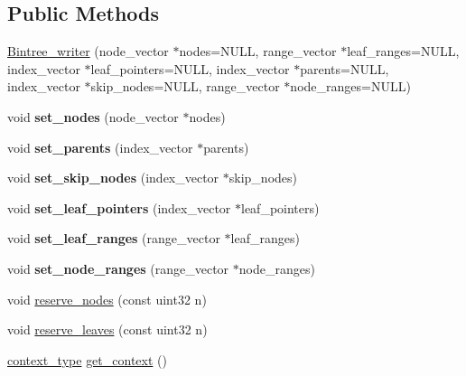 \subsection*{Public Methods}
\begin{DoxyCompactItemize}
\item 
\hyperlink{structcugar_1_1_bintree__writer_aa6285a28d4809fe64221e532ecbec891}{Bintree\+\_\+writer} (node\+\_\+vector $\ast$nodes=N\+U\+LL, range\+\_\+vector $\ast$leaf\+\_\+ranges=N\+U\+LL, index\+\_\+vector $\ast$leaf\+\_\+pointers=N\+U\+LL, index\+\_\+vector $\ast$parents=N\+U\+LL, index\+\_\+vector $\ast$skip\+\_\+nodes=N\+U\+LL, range\+\_\+vector $\ast$node\+\_\+ranges=N\+U\+LL)
\item 
\mbox{\label{structcugar_1_1_bintree__writer_afdc80c794419b3f83e3a6db5383cd63a}} 
void {\bfseries set\+\_\+nodes} (node\+\_\+vector $\ast$nodes)
\item 
\mbox{\label{structcugar_1_1_bintree__writer_a01c1fd5dc32bf390b9c7381b54e501f8}} 
void {\bfseries set\+\_\+parents} (index\+\_\+vector $\ast$parents)
\item 
\mbox{\label{structcugar_1_1_bintree__writer_ad81143b0029d8ad763a7eb78cdd43a88}} 
void {\bfseries set\+\_\+skip\+\_\+nodes} (index\+\_\+vector $\ast$skip\+\_\+nodes)
\item 
\mbox{\label{structcugar_1_1_bintree__writer_a37656872367b3963c7fcf7d4fe5fcebf}} 
void {\bfseries set\+\_\+leaf\+\_\+pointers} (index\+\_\+vector $\ast$leaf\+\_\+pointers)
\item 
\mbox{\label{structcugar_1_1_bintree__writer_a81cb73fb7e3e60b9c1700c56ac17de31}} 
void {\bfseries set\+\_\+leaf\+\_\+ranges} (range\+\_\+vector $\ast$leaf\+\_\+ranges)
\item 
\mbox{\label{structcugar_1_1_bintree__writer_ac4823eac623850f441585d857adffb22}} 
void {\bfseries set\+\_\+node\+\_\+ranges} (range\+\_\+vector $\ast$node\+\_\+ranges)
\item 
void \hyperlink{structcugar_1_1_bintree__writer_a5c181a6cc8ee971fda6435d4d25ad089}{reserve\+\_\+nodes} (const uint32 n)
\item 
void \hyperlink{structcugar_1_1_bintree__writer_aaff80118d0d6e4cc98e8decfedecd332}{reserve\+\_\+leaves} (const uint32 n)
\item 
\hyperlink{structcugar_1_1_bintree__writer__context}{context\+\_\+type} \hyperlink{structcugar_1_1_bintree__writer_a90d28ca497d65523760ab584d569d38a}{get\+\_\+context} ()
\end{DoxyCompactItemize}
